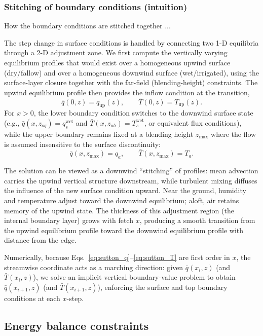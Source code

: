 \documentclass{article}
\begin{document}
    
    \subsubsection*{Stitching of boundary conditions (intuition)}
    How the boundary conditions are stitched together ... 

    \noindent
    The step change in surface conditions is handled by connecting two 1-D equilibria through a 2-D adjustment zone.
    We first compute the vertically varying equilibrium profiles that would exist over a homogeneous upwind surface (dry/fallow) and over a homogeneous downwind surface (wet/irrigated), using the surface-layer closure together with the far-field (blending-height) constraints.
    The upwind equilibrium profile then provides the inflow condition at the transition,
    \[
    \bar q(0,z)=q_{\mathrm{up}}(z),
    \qquad
    \bar T(0,z)=T_{\mathrm{up}}(z).
    \]
    For $x>0$, the lower boundary condition switches to the downwind surface state (e.g.,
    $\bar q(x,z_{oq})=q_{s}^{\mathrm{wet}}$ and $\bar T(x,z_{oh})=T_{s}^{\mathrm{wet}}$, or equivalent flux conditions),
    while the upper boundary remains fixed at a blending height $z_{\max}$ where the flow is assumed insensitive to the surface discontinuity:
    \[
    \bar q(x,z_{\max}) = q_a,
    \qquad
    \bar T(x,z_{\max}) = T_a.
    \]

    \noindent
    The solution can be viewed as a downwind ``stitching'' of profiles:
    mean advection carries the upwind vertical structure downstream, while turbulent mixing diffuses the influence of the new surface condition upward.
    Near the ground, humidity and temperature adjust toward the downwind equilibrium; aloft, air retains memory of the upwind state.
    The thickness of this adjustment region (the internal boundary layer) grows with fetch $x$, producing a smooth transition from the upwind equilibrium profile toward the downwind equilibrium profile with distance from the edge.

    \medskip
    \noindent
    Numerically, because Eqs.~\eqref{eq:sutton_q}--\eqref{eq:sutton_T} are first order in $x$, the streamwise coordinate acts as a marching direction:
    given $\bar q(x_i,z)$ (and $\bar T(x_i,z)$), we solve an implicit vertical boundary-value problem to obtain $\bar q(x_{i+1},z)$ (and $\bar T(x_{i+1},z)$), enforcing the surface and top boundary conditions at each $x$-step.

    
    \subsection*{Energy balance constraints}
    \label{sec:energy-balance}
\end{document}
